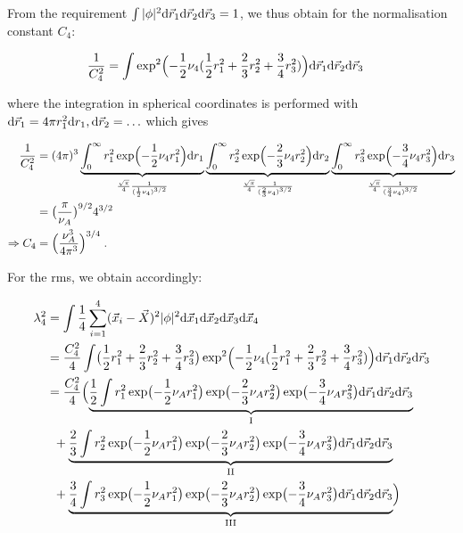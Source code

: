 \documentclass[a4paper,11pt]{scrartcl} %
\begin{document}
\begin{appendix}
\noindent From the requirement $\int|\phi|^2{\rm d}\vec{r}_{1}{\rm d}\vec{r}_{2}{\rm d}\vec{r}_{3} = 1$, we thus obtain for the normalisation constant $C_4$: 

\begin{align}
	{1\over C_{4}^{2}} &= \int \exp^{2}\Bigl(-{1\over 2} \nu_{4} ({1\over 2}r_{1}^{2} + {2\over 3} r_{2}^{2} + {3\over 4}r_{3}^{2}) \Bigr) {\rm d}\vec{r}_{1}{\rm d}\vec{r}_{2}{\rm d}\vec{r}_{3}
\end{align}

\noindent where the integration in spherical coordinates is performed with ${\rm d}\vec{r}_{1} = 4\pi r_{1}^{2}{\rm d}r_{1},  {\rm d}\vec{r}_{2} = \ldots$ which gives

\begin{align}
	{1\over C_{4}^{2}} &= (4\pi)^{3} \underbrace{\int_{0}^{\infty} r_{1}^{2}\exp\Bigl(-{1\over 2} \nu_{4}  r_{1}^{2}  \Bigr)  {\rm d}r_{1}}_{{\sqrt{\pi} \over 4} {1 \over ({1\over 2} \nu_{4})^{3/2}}  }
							\underbrace{\int_{0}^{\infty} r_{2}^{2}\exp\Bigl(-{2\over 3} \nu_{4}  r_{2}^{2}  \Bigr)  {\rm d}r_{2}}_{{\sqrt{\pi} \over 4} {1 \over ({2\over 3} \nu_{4})^{3/2}}  }
							\underbrace{\int_{0}^{\infty} r_{3}^{2}\exp\Bigl(-{3\over 4} \nu_{4}  r_{3}^{2}  \Bigr)  {\rm d}r_{3}}_{{\sqrt{\pi} \over 4} {1 \over ({3\over 4} \nu_{4})^{3/2}}  } \\
		&= \bigl({\pi \over \nu_{A}}\bigr)^{9/2} 4^{3/2} \\
	\Rightarrow C_{4} &= \Bigl({\nu_{A}^{3} \over 4 \pi^{3}}\Bigr)^{3/4} \;.
\end{align}

\noindent For the rms, we obtain accordingly:


\begin{align}
	\lambda_{4}^{2} &= \int {1\over 4}  \sum_{i=1}^{4}(\vec{x}_{i} - \vec{X})^2 |\phi|^2 {\rm d}\vec{x}_{1}{\rm d}\vec{x}_{2}{\rm d}\vec{x}_{3}{\rm d}\vec{x}_{4} \\
				 &= {C_4^2 \over 4}  \int \bigl({1\over 2}r_{1}^{2} + {2\over 3} r_{2}^{2} + {3\over 4}r_{3}^{2} \bigr) \exp^{2}\Bigl(-{1\over 2} \nu_{4} ({1\over 2}r_{1}^{2} + {2\over 3} r_{2}^{2} + {3\over 4}r_{3}^{2}) \Bigr) {\rm d}\vec{r}_{1}{\rm d}\vec{r}_{2}{\rm d}\vec{r}_{3} \\
				 &= {C_4^2 \over 4} \Bigl(\underbrace{{1\over 2} \int r_{1}^2 \exp\bigl(-{1\over2} \nu_A r_{1}^{2}\bigr) \exp\bigl(-{2\over3} \nu_A r_{2}^{2}\bigr) \exp\bigl(-{3\over4} \nu_A r_{3}^{2}\bigr) {\rm d}\vec{r}_{1}{\rm d}\vec{r}_{2}{\rm d}\vec{r}_{3}}_{\rm I} \\
				  &\;\;+ \underbrace{{2\over 3} \int r_{2}^2 \exp\bigl(-{1\over2} \nu_A r_{1}^{2}\bigr) \exp\bigl(-{2\over3} \nu_A r_{2}^{2}\bigr) \exp\bigl(-{3\over4} \nu_A r_{3}^{2}\bigr) {\rm d}\vec{r}_{1}{\rm d}\vec{r}_{2}{\rm d}\vec{r}_{3}}_{\rm II} \\
				  &\;\;+ \underbrace{{3\over 4} \int r_{3}^2 \exp\bigl(-{1\over2} \nu_A r_{1}^{2}\bigr) \exp\bigl(-{2\over3} \nu_A r_{2}^{2}\bigr) \exp\bigl(-{3\over4} \nu_A r_{3}^{2}\bigr) {\rm d}\vec{r}_{1}{\rm d}\vec{r}_{2}{\rm d}\vec{r}_{3}}_{\rm III}
				 \Bigr)
\end{align}


\end{appendix}
\end{document}
